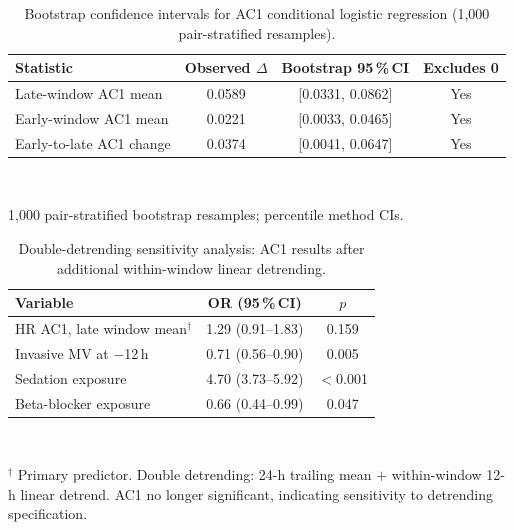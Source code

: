 \documentclass[12pt,a4paper]{article}
\begin{document}
\begin{table}[htbp]
  \centering
  \caption{Bootstrap confidence intervals for AC1 conditional logistic
  regression (1,000 pair-stratified resamples).}
  \label{tab:bootstrap}
  \small
  \begin{tabular}{lccc}
    \toprule
    \textbf{Statistic} & \textbf{Observed $\Delta$} & \textbf{Bootstrap 95\,\%\,CI} & \textbf{Excludes 0} \\
    \midrule
    Late-window AC1 mean   & 0.0589 & [0.0331, 0.0862] & Yes \\
    Early-window AC1 mean  & 0.0221 & [0.0033, 0.0465] & Yes \\
    Early-to-late AC1 change & 0.0374 & [0.0041, 0.0647] & Yes \\
    \bottomrule
  \end{tabular}
  \vspace{2pt}\\
  \raggedright\footnotesize
  1,000 pair-stratified bootstrap resamples; percentile method CIs.
\end{table}

\begin{table}[htbp]
  \centering
  \caption{Double-detrending sensitivity analysis: AC1 results
  after additional within-window linear detrending.}
  \label{tab:doubledetrend}
  \small
  \begin{tabular}{lcc}
    \toprule
    \textbf{Variable} & \textbf{OR (95\,\%\,CI)} & \textbf{$p$} \\
    \midrule
    HR AC1, late window mean$^\dagger$ & 1.29 (0.91--1.83) & 0.159 \\
    Invasive MV at $-$12\,h       & 0.71 (0.56--0.90) & 0.005 \\
    Sedation exposure              & 4.70 (3.73--5.92) & $<$0.001 \\
    Beta-blocker exposure          & 0.66 (0.44--0.99) & 0.047 \\
    \bottomrule
  \end{tabular}
  \vspace{2pt}\\
  \raggedright\footnotesize
  $^\dagger$ Primary predictor.
  Double detrending: 24-h trailing mean $+$ within-window 12-h linear detrend.
  AC1 no longer significant, indicating sensitivity to detrending specification.
\end{table}
\end{document}
